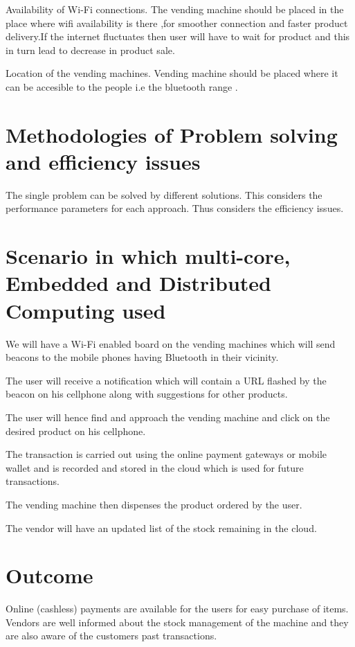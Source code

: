 \documentclass[oneside,a4paper,12pt]{report}
\begin{document}
Availability of Wi-Fi connections.
The vending machine should be placed in the place where wifi availability is there ,for smoother connection and faster product delivery.If the internet fluctuates then user will have to wait for product and this in turn lead to decrease in product sale.
 
Location of the vending machines.
Vending machine should be placed where it can be accesible to the people i.e the bluetooth range .


\section{Methodologies of Problem solving and efficiency issues}
The single problem can be solved by different solutions.  This considers the performance parameters for each approach. Thus considers the efficiency issues.

\section{Scenario in which multi-core, Embedded and Distributed Computing used}

 We will have a Wi-Fi enabled board on the vending machines which will send beacons to the mobile phones having Bluetooth in their vicinity.
 
 The user will receive a notification which will contain a URL flashed by the beacon on his cellphone along with suggestions for other products.

The user will hence find and approach the vending machine and click on the desired product on his cellphone.

 The transaction is carried out using the online payment gateways or mobile wallet and is recorded and stored in the cloud which is used for future transactions.

 The vending machine then dispenses the product ordered by the user.

The vendor will have an updated list of the stock remaining in the cloud.

\section{Outcome}

 Online (cashless) payments are available for the users for easy purchase of items.
Vendors are well informed about the stock management of the machine and they are also aware of the customers past transactions.
\end{document}
